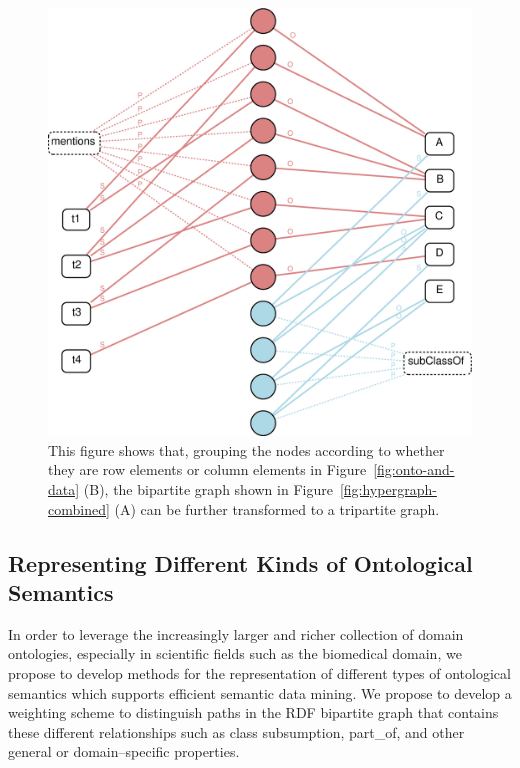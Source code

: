 \begin{figure}[tbh]
\begin{center}
\includegraphics[width=.6\textwidth]{fig/hypergraph_mining-bipartite-weighted.eps}
\end{center}
\caption[Transforming the RDF bipartite graph to suit mining need]{\label{fig:bipartitegraph-weighted} This figure shows that, grouping the nodes according to whether they are row elements or column elements in Figure~\ref{fig:onto-and-data} (B), the bipartite graph shown in Figure~\ref{fig:hypergraph-combined} (A) can be further transformed to a tripartite graph.}
\end{figure}

\subsection{Representing Different Kinds of Ontological Semantics}
\label{sec:rosg}


In order to leverage the increasingly larger and richer collection of domain ontologies, especially in scientific fields such as the biomedical domain, we propose to develop methods for the representation of different types of ontological semantics which supports efficient semantic data mining. We propose to develop a weighting scheme to distinguish paths in the RDF bipartite graph that contains these different relationships such as class subsumption, part\_of, and other general or domain--specific properties. %

